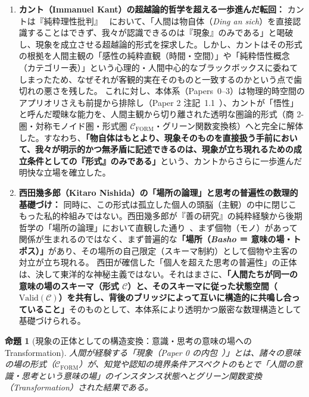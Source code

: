 \documentclass[11pt,a4paper]{ltjsarticle}
\theoremstyle{definition}
\theoremstyle{plain}
\newtheorem{proposition}{命題}[section]
\theoremstyle{remark}
\newcommand{\Valid}{\mathrm{Valid}}
\newcommand{\CFORM}{\mathcal{C}_{\mathrm{FORM}}}
\begin{document}
\begin{enumerate}
    \item \textbf{カント（Immanuel Kant）の超越論的哲学を超える一歩進んだ転回：}
    カントは『純粋理性批判』~\cite{kant1781} において、「人間は物自体（\emph{Ding an sich}）を直接認識することはできず、我々が認識できるのは『現象』のみである」と喝破し、現象を成立させる超越論的形式を探求した。しかし、カントはその形式の根拠を人間主観の「感性の純粋直観（時間・空間）」や「純粋悟性概念（カテゴリー表）」という心理的・人間中心的なブラックボックスに委ねてしまったため、なぜそれが客観的実在そのものと一致するのかという点で歯切れの悪さを残した。
    これに対し、本体系（Papers~0--3）は物理的時空間のアプリオリさえも前提から排除し（Paper 2 注記~1.1~\cite{ota2026paper2}）、カントが「悟性」と呼んだ曖昧な能力を、人間主観から切り離された透明な圏論的形式（商 2-圏・対称モノイド圏・形式圏 $\CFORM$・グリーン関数変換核）へと完全に解体した。すなわち、\textbf{「物自体はもとより、現象そのものを直接扱う手前において、我々が明示的かつ無矛盾に記述できるのは、現象が立ち現れるための成立条件としての『形式』のみである」}という、カントからさらに一歩進んだ明快な立場を確立した。

    \item \textbf{西田幾多郎（Kitaro Nishida）の「場所の論理」と思考の普遍性の数理的基礎づけ：}
    同時に、この形式は孤立した個人の頭脳（主観）の中に閉じこもった私的枠組みではない。西田幾多郎が『善の研究』の純粋経験から後期哲学の「場所の論理」において直観した通り~\cite{nishida1911,nishida1927}、まず個物（モノ）があって関係が生まれるのではなく、まず普遍的な\textbf{「場所（\emph{Basho} ＝ 意味の場・トポス）」}があり、その場所の自己限定（スキーマ制約）として個物や主客の対立が立ち現れる。
    西田が確信した「個人を超えた思考の普遍性」の正体は、決して東洋的な神秘主義ではない。それはまさに、\textbf{「人間たちが同一の意味の場のスキーマ（形式 $\mathcal{C}$）と、そのスキーマに従った状態空間（$\Valid(\mathcal{C})$）を共有し、背後のブリッジによって互いに構造的に共鳴し合っていること」}そのものとして、本体系により透明かつ厳密な数理構造として基礎づけられる。
\end{enumerate}

\begin{proposition}[現象の正体としての構造変換：意識・思考の意味の場への Transformation]\label{prop:phenomena-transformation}
人間が経験する「現象（Paper 0 の内包~\cite{ota2026paper0}）」とは、諸々の意味の場の形式（$\CFORM$）が、知覚や認知の境界条件アスペクトのもとで「人間の意識・思考という意味の場」のインスタンス状態へとグリーン関数変換（Transformation）された結果である。
\end{proposition}
\end{document}
